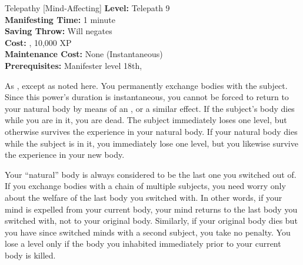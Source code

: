 {Telepathy [Mind-Affecting]}
{
	\textbf{Level:}
	Telepath 9\\
	\textbf{Manifesting Time:}
	1 minute\\
	\textbf{Saving Throw:}
	Will negates\\
	\textbf{Cost:}
	, 10,000 XP\\
	\textbf{Maintenance Cost:}
	None (Instantaneous)\\
	\textbf{Prerequisites:}
	Manifester level 18th, \\
}
{
	As , except as noted here. You permanently exchange bodies with the subject. Since this power's duration is instantaneous, you cannot be forced to return to your natural body by means of an , or a similar effect. If the subject's body dies while you are in it, you are dead. The subject immediately loses one level, but otherwise survives the experience in your natural body. If your natural body dies while the subject is in it, you immediately lose one level, but you likewise survive the experience in your new body.

	Your ``natural'' body is always considered to be the last one you switched out of. If you exchange bodies with a chain of multiple subjects, you need worry only about the welfare of the last body you switched with. In other words, if your mind is expelled from your current body, your mind returns to the last body you switched with, not to your original body. Similarly, if your original body dies but you have since switched minds with a second subject, you take no penalty. You lose a level only if the body you inhabited immediately prior to your current body is killed.
}